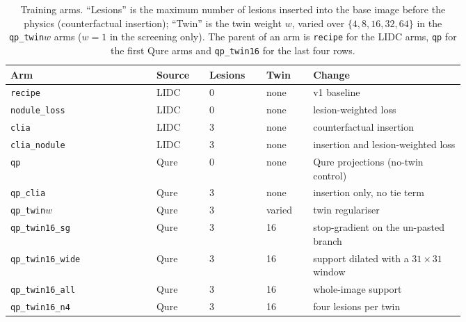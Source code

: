 \begin{table}[htbp]
\centering\small
\renewcommand{\arraystretch}{1.15}
\caption{Training arms. ``Lesions'' is the maximum number of lesions inserted into the base image before the physics (counterfactual insertion);
``Twin'' is the twin weight $w$, varied over $\{4,8,16,32,64\}$ in the \texttt{qp\_twin}$w$ arms ($w=1$ in the screening only). The parent of an arm is \texttt{recipe} for the
LIDC arms, \texttt{qp} for the first Qure arms and \texttt{qp\_twin16} for the last four rows.}
\label{tab:arms}
\begin{tabular}{@{}p{0.25\linewidth}p{0.08\linewidth}p{0.09\linewidth}p{0.08\linewidth}p{0.26\linewidth}@{}}
\toprule
Arm & Source & Lesions & Twin & Change \\
\midrule
\texttt{recipe} & LIDC & 0 & none & v1 baseline \\
\texttt{nodule\_loss} & LIDC & 0 & none & lesion-weighted loss \\
\texttt{clia} & LIDC & 3 & none & counterfactual insertion \\
\texttt{clia\_nodule} & LIDC & 3 & none & insertion and lesion-weighted loss \\
\texttt{qp} & Qure & 0 & none & Qure projections (no-twin control) \\
\texttt{qp\_clia} & Qure & 3 & none & insertion only, no tie term \\
\texttt{qp\_twin}$w$ & Qure & 3 & varied & twin regulariser \\
\texttt{qp\_twin16\_sg} & Qure & 3 & 16 & stop-gradient on the un-pasted branch \\
\texttt{qp\_twin16\_wide} & Qure & 3 & 16 & support dilated with a $31\times31$ window \\
\texttt{qp\_twin16\_all} & Qure & 3 & 16 & whole-image support \\
\texttt{qp\_twin16\_n4} & Qure & 3 & 16 & four lesions per twin \\
\bottomrule
\end{tabular}
\end{table}


